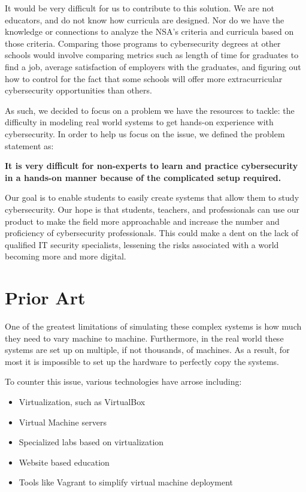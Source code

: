 \documentclass[openright]{report}
\begin{document}
\par It would be very difficult for us to contribute to this solution. We are not educators, and do not know how curricula are designed. Nor do we have the knowledge or connections to analyze the NSA's criteria and curricula based on those criteria. Comparing those programs to cybersecurity degrees at other schools would involve comparing metrics such as length of time for graduates to find a job, average satisfaction of employers with the graduates, and figuring out how to control for the fact that some schools will offer more extracurricular cybersecurity opportunities than others. 

\par As such, we decided to focus on a problem we have the resources to tackle: the difficulty in modeling real world systems to get hands-on experience with cybersecurity. In order to help us focus on the issue, we defined the problem statement as:

\textbf{It is very difficult for non-experts to learn and practice cybersecurity in a hands-on manner because of the complicated setup required.}

\par Our goal is to enable students to easily create systems that allow them to study cybersecurity. Our hope is that students, teachers, and professionals can use our product to make the field more approachable and increase the number and proficiency of cybersecurity professionals. This could make a dent on the lack of qualified IT security specialists, lessening the risks associated with a world becoming more and more digital.

\section{Prior Art}

\par One of the greatest limitations of simulating these complex systems is how much they need to vary machine to machine. Furthermore, in the real world these systems are set up on multiple, if not thousands, of machines. As a result, for most it is impossible to set up the hardware to perfectly copy the systems.

\par To counter this issue, various technologies have arrose including:
\begin{itemize}
    \item Virtualization, such as VirtualBox
    \item Virtual Machine servers
    \item Specialized labs based on virtualization
    \item Website based education
    \item Tools like Vagrant to simplify virtual machine deployment
\end{itemize}
\end{document}
